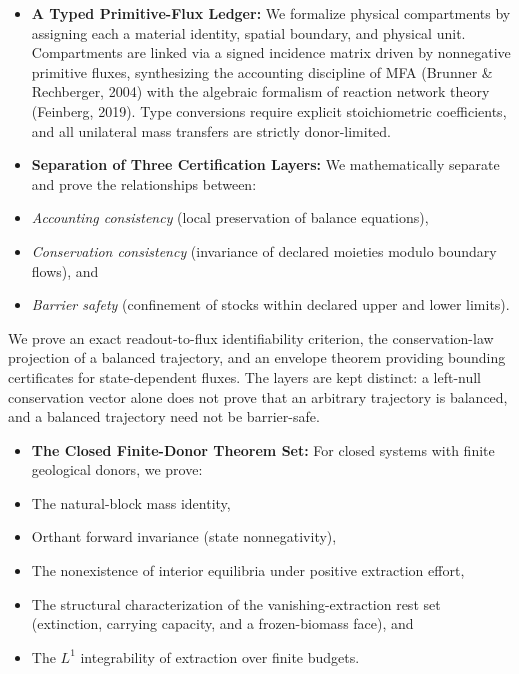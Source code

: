 \documentclass[11pt]{article}
\begin{document}
\begin{itemize}\setlength{\itemsep}{2pt}
\item \textbf{A Typed Primitive-Flux Ledger:} We formalize physical compartments by assigning each a material identity, spatial boundary, and physical unit. Compartments are linked via a signed incidence matrix driven by nonnegative primitive fluxes, synthesizing the accounting discipline of MFA (Brunner \& Rechberger, 2004) with the algebraic formalism of reaction network theory (Feinberg, 2019). Type conversions require explicit stoichiometric coefficients, and all unilateral mass transfers are strictly donor-limited.
\item \textbf{Separation of Three Certification Layers:} We mathematically separate and prove the relationships between:
\item \emph{Accounting consistency} (local preservation of balance equations),
\item \emph{Conservation consistency} (invariance of declared moieties modulo boundary flows), and
\item \emph{Barrier safety} (confinement of stocks within declared upper and lower limits).
\end{itemize}

We prove an exact readout-to-flux identifiability criterion, the conservation-law projection of a balanced trajectory, and an envelope theorem providing bounding certificates for state-dependent fluxes. The layers are kept distinct: a left-null conservation vector alone does not prove that an arbitrary trajectory is balanced, and a balanced trajectory need not be barrier-safe.

\begin{itemize}\setlength{\itemsep}{2pt}
\item \textbf{The Closed Finite-Donor Theorem Set:} For closed systems with finite geological donors, we prove:
\item The natural-block mass identity,
\item Orthant forward invariance (state nonnegativity),
\item The nonexistence of interior equilibria under positive extraction effort,
\item The structural characterization of the vanishing-extraction rest set (extinction, carrying capacity, and a frozen-biomass face), and
\item The \(L^1\) integrability of extraction over finite budgets.
\end{itemize}
\end{document}
